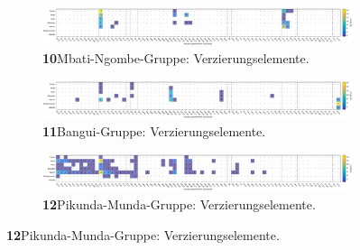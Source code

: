 \addtocounter{figure}{-1}
\begin{figure}

\centering
\begin{subfigure}{\textwidth}
	\setcounter{subfigure}{9}
	\centering
	\includegraphics[width=\textwidth]{fig/MBN_Verzierungselmente.pdf}
	\caption*{\textbf{10}\hspace{1em}Mbati-Ngombe-Gruppe: Verzierungselemente. \vspace{\baselineskip}}
	\label{fig:MBN_Verz}
\end{subfigure}

\begin{subfigure}{\textwidth}
	\centering
	\includegraphics[width=\textwidth]{fig/BAN_Verzierungselmente.pdf}
	\caption*{\textbf{11}\hspace{1em}Bangui-Gruppe: Verzierungselemente. \vspace{\baselineskip}}
	\label{fig:BAN_Verz}
\end{subfigure}

\begin{subfigure}{\textwidth}
	\centering
	\includegraphics[width=\textwidth]{fig/PKM_Verzierungselmente.pdf}
	\caption*{\textbf{12}\hspace{1em}Pikunda-Munda-Gruppe: Verzierungselemente. \vspace{\baselineskip}}
	\label{fig:PIKMUN_Verz}
\end{subfigure}
\end{figure}

